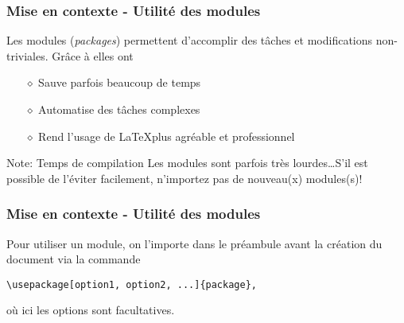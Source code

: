 
\begin{frame}
    \frametitle{Mise en contexte - Utilité des modules}
    Les modules (\textit{packages}) permettent d'accomplir
    des tâches et modifications non-triviales. Grâce à elles ont
    \vspace{0.3cm}
    \begin{itemize}
        \pause
        \item[$\diamond$] Sauve parfois beaucoup de temps
        \item[$\diamond$] Automatise des tâches complexes
        \item[$\diamond$] Rend l'usage de \LaTeX\;plus agréable et professionnel
    \end{itemize}
    \vfill
    \pause
    \begin{noteblock}{Note: Temps de compilation}
        Les modules sont parfois très lourdes\dots\;S'il est possible de l'éviter
        facilement, n'importez pas de nouveau(x) modules(s)!
    \end{noteblock}
\end{frame}

\begin{frame}[fragile]
    \frametitle{Mise en contexte - Utilité des modules}
    Pour utiliser un module, on l'importe dans le préambule \textcolor{vibrant_green}{avant la création du
    document} via la commande
    \vfill
    \begin{lstlisting}[xleftmargin=-10mm]
        \usepackage[option1, option2, ...]{package},
    \end{lstlisting}
    \vfill
    où ici les options sont facultatives.
\end{frame}
